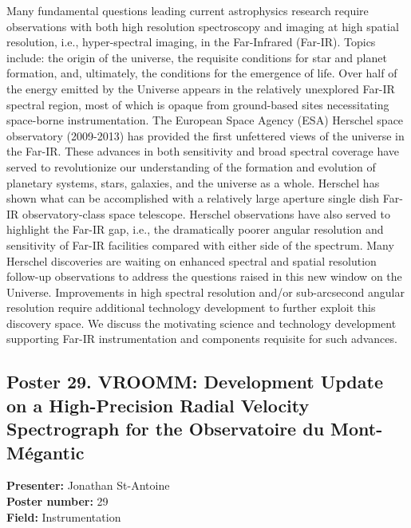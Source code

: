 Many fundamental questions leading current astrophysics research require observations with both high resolution spectroscopy and imaging at high spatial resolution, i.e., hyper-spectral imaging, in the Far-Infrared (Far-IR). Topics include: the origin of the universe, the requisite conditions for star and planet formation, and, ultimately, the conditions for the emergence of life. Over half of the energy emitted by the Universe appears in the relatively unexplored Far-IR spectral region, most of which is opaque from ground-based sites necessitating space-borne instrumentation. The European Space Agency (ESA) Herschel space observatory (2009-2013) has provided the first unfettered views of the universe in the Far-IR. These advances in both sensitivity and broad spectral coverage have served to revolutionize our understanding of the formation and evolution of planetary systems, stars, galaxies, and the universe as a whole. Herschel has shown what can be accomplished with a relatively large aperture single dish Far-IR observatory-class space telescope. Herschel observations have also served to highlight the Far-IR gap, i.e., the dramatically poorer angular resolution and sensitivity of Far-IR facilities compared with either side of the spectrum. Many Herschel discoveries are waiting on enhanced spectral and spatial resolution follow-up observations to address the questions raised in this new window on the Universe. Improvements in high spectral resolution and/or sub-arcsecond angular resolution require additional technology development to further exploit this discovery space. We discuss the motivating science and technology development supporting Far-IR instrumentation and components requisite for such advances.

\hypertarget{poster-abstract-talk-168}{}\label{poster-abstract-page-talk-168}
\subsection*{Poster 29. VROOMM: Development Update on a High-Precision Radial Velocity Spectrograph for the Observatoire du Mont-Mégantic}
\textbf{Presenter:} Jonathan St-Antoine\\
\textbf{Poster number:} 29\\
\textbf{Field:} Instrumentation

